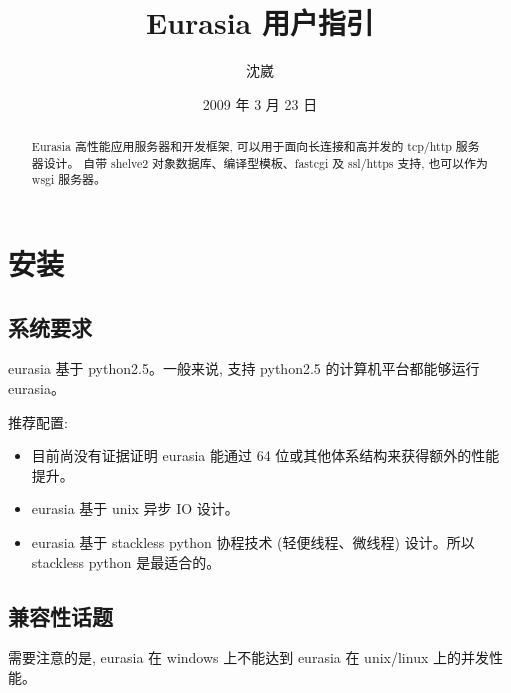 \documentclass{manual}
\title{Eurasia 用户指引}
\author{沈崴}
\date{2009 年 3 月 23 日}
\begin{document}
\maketitle

\begin{abstract}

\noindent

Eurasia 高性能应用服务器和开发框架, 可以用于面向长连接和高并发的 tcp/http 服务器设计。
自带 shelve2 对象数据库、编译型模板、fastcgi 及 ssl/https 支持, 也可以作为 wsgi 服务器。

\end{abstract}

\tableofcontents

\chapter{安装}

\section{系统要求}

eurasia 基于 python2.5。一般来说, 支持 python2.5 的计算机平台都能够运行 eurasia。

推荐配置:

\begin{itemize}

\item {}

目前尚没有证据证明 eurasia 能通过 64 位或其他体系结构来获得额外的性能提升。

\item {}

eurasia 基于 unix 异步 IO 设计。

\item {}

eurasia 基于 stackless python 协程技术 (轻便线程、微线程) 设计。所以 stackless python 是最适合的。

\end{itemize}

\section{兼容性话题}


需要注意的是, eurasia 在 windows 上不能达到 eurasia 在 unix/linux 上的并发性能。
\end{document}
